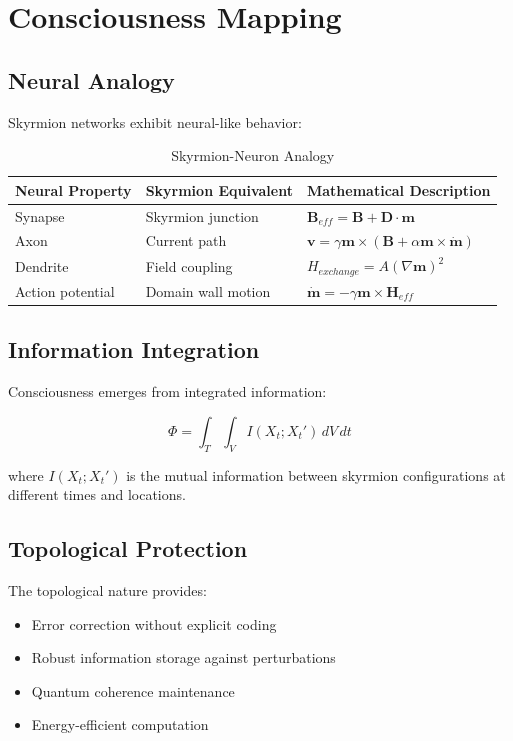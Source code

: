 \documentclass[12pt,a4paper]{article}
\begin{document}
\section{Consciousness Mapping}

\subsection{Neural Analogy}

Skyrmion networks exhibit neural-like behavior:

\begin{table}[H]
\centering
\caption{Skyrmion-Neuron Analogy}
\begin{tabular}{@{}lll@{}}
\toprule
Neural Property & Skyrmion Equivalent & Mathematical Description \\
\midrule
Synapse & Skyrmion junction & $\mathbf{B}_{eff} = \mathbf{B} + \mathbf{D} \cdot \mathbf{m}$ \\
Axon & Current path & $\mathbf{v} = \gamma \mathbf{m} \times (\mathbf{B} + \alpha \mathbf{m} \times \dot{\mathbf{m}})$ \\
Dendrite & Field coupling & $H_{exchange} = A (\nabla \mathbf{m})^2$ \\
Action potential & Domain wall motion & $\dot{\mathbf{m}} = -\gamma \mathbf{m} \times \mathbf{H}_{eff}$ \\
\bottomrule
\end{tabular}
\end{table}

\subsection{Information Integration}

Consciousness emerges from integrated information:

\[
\Phi = \int_T \int_V I(X_t; X_t') \, dV \, dt
\]

where $I(X_t; X_t')$ is the mutual information between skyrmion configurations at different times and locations.

\subsection{Topological Protection}

The topological nature provides:
\begin{itemize}
    \item Error correction without explicit coding
    \item Robust information storage against perturbations
    \item Quantum coherence maintenance
    \item Energy-efficient computation
\end{itemize}
\end{document}
